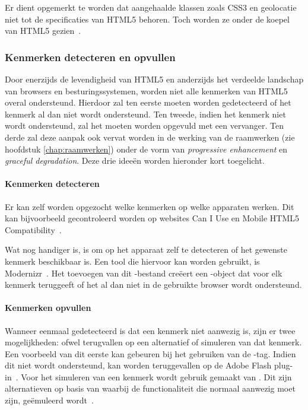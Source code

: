 Er dient opgemerkt te worden dat aangehaalde klassen zoals CSS3 en geolocatie niet tot de specificaties van HTML5 behoren. 
Toch worden ze onder de koepel van HTML5 gezien~\cite{MacDonald2011}.

\subsubsection{Kenmerken detecteren en opvullen}
Door enerzijds de levendigheid van HTML5 en anderzijds het verdeelde landschap van browsers en besturingssystemen, worden niet alle kenmerken van HTML5 overal ondersteund. 
Hierdoor zal ten eerste moeten worden gedetecteerd of het kenmerk al dan niet wordt ondersteund.
Ten tweede, indien het kenmerk niet wordt ondersteund, zal het moeten worden opgevuld met een vervanger.
Ten derde zal deze aanpak ook vervat worden in de werking van de raamwerken (zie hoofdstuk \ref{chap:raamwerken}) onder de vorm van \emph{progressive enhancement} en \emph{graceful degradation}.
Deze drie ideeën worden hieronder kort toegelicht.

\paragraph{Kenmerken detecteren}
Er kan zelf worden opgezocht welke kenmerken op welke apparaten werken. 
Dit kan bijvoorbeeld gecontroleerd worden op websites Can I Use en Mobile HTML5 Compatibility~\cite{Deveria2013c,Firtman2013a,MacDonald2011}. 

Wat nog handiger is, is om op het apparaat zelf te detecteren of het gewenste kenmerk beschikbaar is. 
Een tool die hiervoor kan worden gebruikt, is Modernizr~\cite{Modernizr2012}. 
Het toevoegen van dit \js{}-bestand creëert een \js{}-object dat voor elk kenmerk teruggeeft of het al dan niet in de gebruikte browser wordt ondersteund.

\paragraph{Kenmerken opvullen}
Wanneer eenmaal gedetecteerd is dat een kenmerk niet aanwezig is, zijn er twee mogelijkheden: ofwel terugvallen op een alternatief of simuleren van dat kenmerk. 
Een voorbeeld van dit eerste kan gebeuren bij het gebruiken van de -tag. 
Indien dit niet wordt ondersteund, kan worden teruggevallen op de Adobe Flash plug-in~\cite{Adobe2013}. 
Voor het simuleren van een kenmerk wordt gebruik gemaakt van . 
Dit zijn alternatieven op basis van \js{} waarbij de  functionaliteit die normaal aanwezig moet zijn, geëmuleerd wordt~\cite{MacDonald2011,Weyl2011}.

